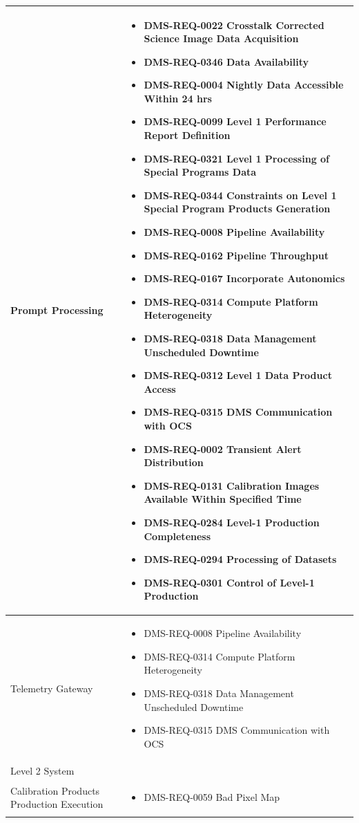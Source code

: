\documentclass[DM,lsstdraft,toc]{lsstdoc}
\begin{document}
\begin{xtabular}{|p{0.1\textwidth}|p{0.85\textwidth}|}
Prompt Processing &
\begin{itemize} \item DMS-REQ-0022 Crosstalk Corrected Science Image Data Acquisition
\item DMS-REQ-0346 Data Availability
\item DMS-REQ-0004 Nightly Data Accessible Within 24 hrs
\item DMS-REQ-0099 Level 1 Performance Report Definition
\item DMS-REQ-0321 Level 1 Processing of Special Programs Data
\item DMS-REQ-0344 Constraints on Level 1 Special Program Products Generation
\item DMS-REQ-0008 Pipeline Availability
\item DMS-REQ-0162 Pipeline Throughput
\item DMS-REQ-0167 Incorporate Autonomics
\item DMS-REQ-0314 Compute Platform Heterogeneity
\item DMS-REQ-0318 Data Management Unscheduled Downtime
\item DMS-REQ-0312 Level 1 Data Product Access
\item DMS-REQ-0315 DMS Communication with OCS
\item DMS-REQ-0002 Transient Alert Distribution
\item DMS-REQ-0131 Calibration Images Available Within Specified Time
\item DMS-REQ-0284 Level-1 Production Completeness
\item DMS-REQ-0294 Processing of Datasets
\item DMS-REQ-0301 Control of Level-1 Production \end{itemize} \\ \hline
Telemetry Gateway &
\begin{itemize} \item DMS-REQ-0008 Pipeline Availability
\item DMS-REQ-0314 Compute Platform Heterogeneity
\item DMS-REQ-0318 Data Management Unscheduled Downtime
\item DMS-REQ-0315 DMS Communication with OCS \end{itemize} \\ \hline Level 2 System & \\ \hline
Calibration Products Production Execution &
\begin{itemize} \item DMS-REQ-0059 Bad Pixel Map

\end{itemize}
\end{xtabular}
\end{document}
